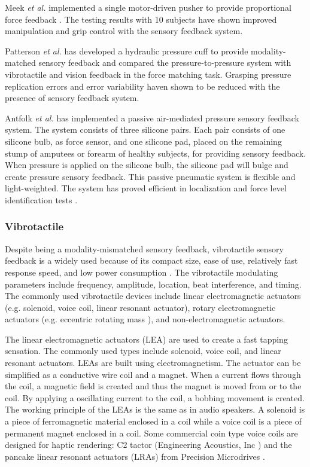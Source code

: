 Meek \textit{et al.} implemented a single motor-driven pusher to provide proportional force feedback \cite{meek1989extended}. The testing results with 10 subjects have shown improved manipulation and grip control with the sensory feedback system.

Patterson \textit{et al.} has developed a hydraulic pressure cuff to provide modality-matched sensory feedback and compared the pressure-to-pressure system with vibrotactile and vision feedback in the force matching task. Grasping pressure replication errors and error variability haven shown to be reduced with the presence of sensory feedback system.

Antfolk \textit{et al.} has implemented a passive air-mediated pressure sensory feedback system. The system consists of three silicone pairs. Each pair consists of one silicone bulb, as force sensor, and one silicone pad, placed on the remaining stump of amputees or forearm of healthy subjects, for providing sensory feedback. When pressure is applied on the silicone bulb,  the silicone pad will bulge and create pressure sensory feedback. This passive pneumatic system is flexible and light-weighted. The system has proved efficient in localization and force level identification tests \cite{antfolk2013sensory}.

\subsubsection{Vibrotactile}
Despite being a modality-mismatched sensory feedback, vibrotactile sensory feedback is a widely used because of its compact size, ease of use, relatively fast response speed,  and low power consumption \cite{schofield2014applications}. The vibrotactile modulating parameters include frequency, amplitude, location, beat interference, and timing. The commonly used vibrotactile devices include linear electromagnetic actuators (e.g. solenoid, voice coil, linear resonant actuator), rotary electromagnetic actuators (e.g. eccentric rotating mass ), and non-electromagnetic actuators. 

The linear electromagnetic actuators (LEA) are used to create a fast tapping sensation. The commonly used types include solenoid, voice coil, and linear resonant actuators. LEAs are built using electromagnetism. The actuator can be simplified as a conductive wire coil and a magnet. When a current flows through the coil, a magnetic field is created and thus the magnet is moved from or to the coil. By applying a oscillating current to the coil, a bobbing movement is created. The working principle of the LEAs is the same as in audio speakers. A solenoid is a piece of ferromagnetic material enclosed in a coil while a voice coil is a piece of permanent magnet enclosed in a coil. Some commercial coin type voice coils are designed for haptic rendering: C2 tactor (Engineering Acoustics, Inc \cite{c2_tactor}) and the  pancake linear resonant actuators (LRAs) from Precision Microdrives \cite{linear_resonant_actuators}.

